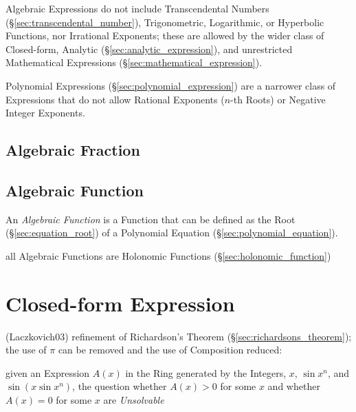 Algebraic Expressions do not include Transcendental Numbers
(\S\ref{sec:transcendental_number}), Trigonometric, Logarithmic, or Hyperbolic
Functions, nor Irrational Exponents; these are allowed by the wider class of
Closed-form, Analytic (\S\ref{sec:analytic_expression}), and unrestricted
Mathematical Expressions (\S\ref{sec:mathematical_expression}).

\fist Polynomial Expressions (\S\ref{sec:polynomial_expression}) are a narrower
class of Expressions that do not allow Rational Exponents ($n$-th Roots) or
Negative Integer Exponents.



\subsection{Algebraic Fraction}\label{sec:algebraic_fraction}

\subsection{Algebraic Function}\label{sec:algebraic_function}

An \emph{Algebraic Function} is a Function that can be defined as the Root
(\S\ref{sec:equation_root}) of a Polynomial Equation
(\S\ref{sec:polynomial_equation}).

all Algebraic Functions are Holonomic Functions
(\S\ref{sec:holonomic_function})



\section{Closed-form Expression}\label{sec:closed_form_expression}

(Laczkovich03) refinement of Richardson's Theorem
(\S\ref{sec:richardsons_theorem}); the use of $\pi$ can be removed and the use
of Composition reduced:

given an Expression $A(x)$ in the Ring generated by the Integers, $x$, $\sin
x^n$, and $\sin(x \sin x^n)$, the question whether $A(x) > 0$ for some $x$ and
whether $A(x) = 0$ for some $x$ are \emph{Unsolvable}



